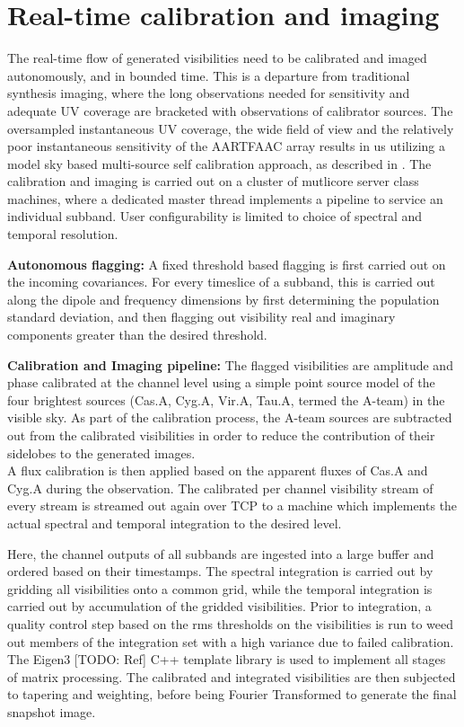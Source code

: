 \documentclass{ws-jai}
\begin{document}
\section {\label{sec:calim} Real-time calibration and imaging}
The real-time  flow of generated visibilities  need to be calibrated  and imaged
autonomously,  and  in bounded  time.   This  is  a departure  from  traditional
synthesis  imaging,  where the  long  observations  needed for  sensitivity  and
adequate UV coverage are bracketed  with observations of calibrator sources. The
oversampled instantaneous UV coverage, the wide field of view and the relatively
poor instantaneous sensitivity  of the AARTFAAC array results in  us utilizing a
model  sky  based  multi-source  self  calibration  approach,  as  described  in
\cite{prasad}.   The calibration  and imaging  is carried  out on  a cluster  of
mutlicore server  class machines, where  a dedicated master thread  implements a
pipeline to service  an individual subband.  User configurability  is limited to
choice of spectral and temporal resolution.

\textbf {Autonomous flagging:} A fixed threshold based flagging is first carried
out  on the  incoming covariances.  For every  timeslice of  a subband,  this is
carried out along  the dipole and frequency dimensions by  first determining the
population  standard  deviation,  and  then flagging  out  visibility  real  and
imaginary components greater than the desired threshold.

\textbf  {Calibration  and  Imaging  pipeline:}  The  flagged  visibilities  are
amplitude and phase calibrated at the  channel level using a simple point source
model of  the four  brightest sources  (Cas.A, Cyg.A,  Vir.A, Tau.A,  termed the
A-team)  in the  visible sky.  As part  of the  calibration process,  the A-team
sources are subtracted  out from the calibrated visibilities in  order to reduce
the  contribution  of  their  sidelobes   to  the  generated  images.\\  A  flux
calibration is  then applied  based on  the apparent fluxes  of Cas.A  and Cyg.A
during the  observation. The calibrated  per channel visibility stream  of every
stream is streamed out  again over TCP to a machine  which implements the actual
spectral and temporal integration to the desired level.

Here, the channel outputs  of all subbands are ingested into  a large buffer and
ordered based on  their timestamps.  The spectral integration is  carried out by
gridding all visibilities onto a common  grid, while the temporal integration is
carried out by accumulation of the gridded visibilities. Prior to integration, a
quality control step based  on the rms thresholds on the  visibilities is run to
weed out  members of  the integration  set with  a high  variance due  to failed
calibration.  The Eigen3  [TODO: Ref] C++ template library is  used to implement
all stages of matrix processing.  The calibrated and integrated visibilities are
then subjected  to tapering and  weighting, before being Fourier  Transformed to
generate the final snapshot image.
\end{document}

